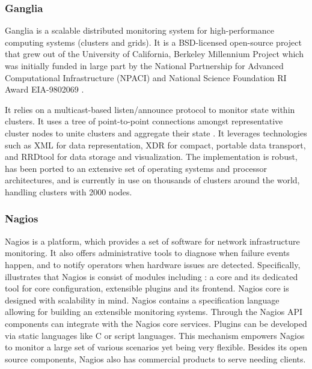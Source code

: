 \subsubsection{Ganglia}

     Ganglia is a scalable distributed monitoring system for
     high-performance computing systems (clusters and grids). It is a
     BSD-licensed open-source project that grew out of the University
     of California, Berkeley Millennium Project which was initially
     funded in large part by the National Partnership for Advanced
     Computational Infrastructure (NPACI) and National Science
     Foundation RI Award EIA-9802069 \cite{www-gms}.

     It relies on a multicast-based listen/announce protocol to
     monitor state within clusters. It uses a tree of point-to-point
     connections amongst representative cluster nodes to unite
     clusters and aggregate their state \cite{www-gsoft}. It
     leverages technologies such as XML for data representation, XDR
     for compact, portable data transport, and RRDtool for data
     storage and visualization. The implementation is robust, has been
     ported to an extensive set of operating systems and processor
     architectures, and is currently in use on thousands of clusters
     around the world, handling clusters with 2000 nodes.
     
\subsubsection{Nagios \cite{www-nagios}}

     Nagios is a platform, which provides a set of software for
     network infrastructure monitoring. It also offers administrative
     tools to diagnose when failure events happen, and to notify
     operators when hardware issues are detected. Specifically,
     illustrates that Nagios is consist of modules including
     \cite{nagios-book}: a core and its dedicated tool for core
     configuration, extensible plugins and its frontend. Nagios core
     is designed with scalability in mind.  Nagios contains a
     specification language allowing for building an extensible
     monitoring systems.  Through the Nagios API components can
     integrate with the Nagios core services. Plugins can be developed
     via static languages like C or script languages. This mechanism
     empowers Nagios to monitor a large set of various scenarios yet
     being very flexible. \cite{nagios-paper-2012} Besides its open
     source components, Nagios also has commercial products to serve
     needing clients.


